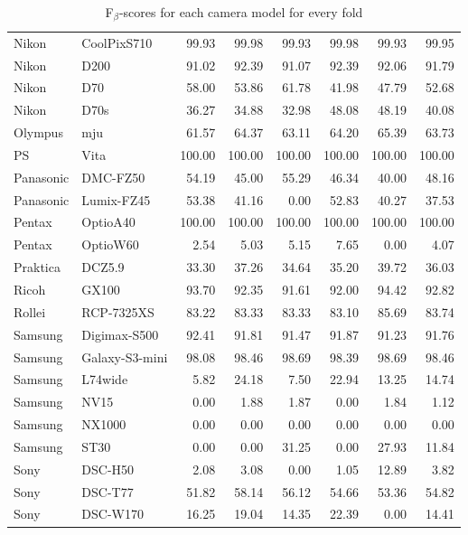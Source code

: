 \begin{table}[h]
{\begin{tabular}{|l|l|r|r|r|r|r|r|}
Nikon & CoolPixS710 & 99.93 & 99.98 & 99.93 & 99.98 & 99.93 & 99.95\\
Nikon & D200 & 91.02 & 92.39 & 91.07 & 92.39 & 92.06 & 91.79\\
Nikon & D70 & 58.00 & 53.86 & 61.78 & 41.98 & 47.79 & 52.68\\
Nikon & D70s & 36.27 & 34.88 & 32.98 & 48.08 & 48.19 & 40.08\\
Olympus & mju & 61.57 & 64.37 & 63.11 & 64.20 & 65.39 & 63.73\\
PS & Vita & 100.00 & 100.00 & 100.00 & 100.00 & 100.00 & 100.00\\
Panasonic & DMC-FZ50 & 54.19 & 45.00 & 55.29 & 46.34 & 40.00 & 48.16\\
Panasonic & Lumix-FZ45 & 53.38 & 41.16 & 0.00 & 52.83 & 40.27 & 37.53\\
Pentax & OptioA40 & 100.00 & 100.00 & 100.00 & 100.00 & 100.00 & 100.00\\
Pentax & OptioW60 & 2.54 & 5.03 & 5.15 & 7.65 & 0.00 & 4.07\\
Praktica & DCZ5.9 & 33.30 & 37.26 & 34.64 & 35.20 & 39.72 & 36.03\\
Ricoh & GX100 & 93.70 & 92.35 & 91.61 & 92.00 & 94.42 & 92.82\\
Rollei & RCP-7325XS & 83.22 & 83.33 & 83.33 & 83.10 & 85.69 & 83.74\\
Samsung & Digimax-S500 & 92.41 & 91.81 & 91.47 & 91.87 & 91.23 & 91.76\\
Samsung & Galaxy-S3-mini & 98.08 & 98.46 & 98.69 & 98.39 & 98.69 & 98.46\\
Samsung & L74wide & 5.82 & 24.18 & 7.50 & 22.94 & 13.25 & 14.74\\
Samsung & NV15 & 0.00 & 1.88 & 1.87 & 0.00 & 1.84 & 1.12\\
Samsung & NX1000 & 0.00 & 0.00 & 0.00 & 0.00 & 0.00 & 0.00\\
Samsung & ST30 & 0.00 & 0.00 & 31.25 & 0.00 & 27.93 & 11.84\\
Sony & DSC-H50 & 2.08 & 3.08 & 0.00 & 1.05 & 12.89 & 3.82\\
Sony & DSC-T77 & 51.82 & 58.14 & 56.12 & 54.66 & 53.36 & 54.82\\
Sony & DSC-W170 & 16.25 & 19.04 & 14.35 & 22.39 & 0.00 & 14.41\\
\hline
\end{tabular}
}
\label{tab:cameramodel_result}
\caption{F$_\beta$-scores for each camera model for every fold}
\end{table}
